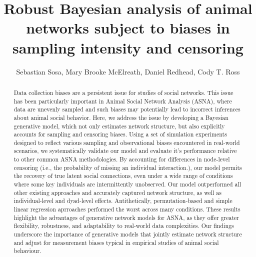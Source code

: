 \documentclass[Afour,sageh,times]{sagej}
\begin{document}

\title{Robust Bayesian analysis of animal networks subject to biases in sampling intensity and censoring }

\author{Sebastian Sosa, Mary Brooke McElreath,  Daniel Redhead, Cody T. Ross }







\begin{abstract}
Data collection biases are a persistent issue for studies of social networks. This issue has been particularly important in  Animal Social Network Analysis (ASNA), where data are unevenly sampled and such biases may potentially lead to incorrect inferences about animal social behavior. Here, we address the issue by developing a Bayesian generative model, which not only estimates network structure, but also explicitly accounts for sampling and censoring biases. Using a set of simulation experiments designed to reflect various sampling and observational biases encountered in real-world scenarios, we systematically validate our model and evaluate it's performance relative to other common ASNA methodologies. By accounting for differences in node-level censoring (i.e., the probability of missing an individual interaction.), our model permits the recovery of true latent social connections, even under a wide range of conditions where some key individuals are intermittently unobserved. Our model outperformed all other existing approaches and accurately captured network structure, as well as individual-level and dyad-level effects. Antithetically, permutation-based and simple linear regression aprroaches performed the worst across many conditions. These results highlight the advantages of generative network models for ASNA, as they offer greater flexibility, robustness, and adaptability to real-world data complexities. Our findings underscore the importance of generative models that jointly estimate network structure and adjust for measurement biases typical in empirical studies of animal social behaviour.
\end{abstract}
\end{document}
